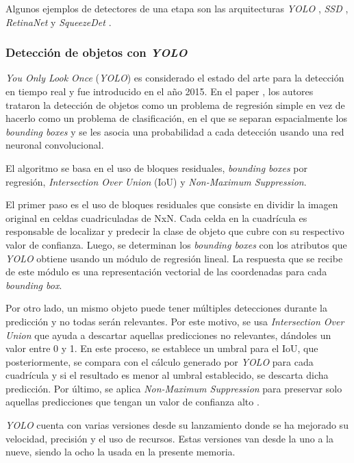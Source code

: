 Algunos ejemplos de detectores de una etapa son las arquitecturas \textit{YOLO} \cite{ARTICLE:13}, \textit{SSD} \cite{ARTICLE:14}, \textit{RetinaNet} \cite{ARTICLE:15} y \textit{SqueezeDet} \cite{ARTICLE:16}. 

\subsubsection{Detección de objetos con \textit{YOLO}}

\textit{You Only Look Once} (\textit{YOLO}) es considerado el estado del arte para la detección en tiempo real y fue introducido en el año 2015. En el paper \cite{ARTICLE:13}, los autores trataron la detección de objetos como un problema de regresión simple en vez de hacerlo como un problema de clasificación, en el que se separan espacialmente los \textit{bounding boxes} y se les asocia una probabilidad a cada detección usando una red neuronal convolucional.

El algoritmo se basa en el uso de bloques residuales, \textit{bounding boxes} por regresión, \textit{Intersection Over Union} (IoU) y \textit{Non-Maximum Suppression}.

El primer paso es el uso de bloques residuales que consiste en dividir la imagen original en celdas cuadriculadas de NxN. Cada celda en la cuadrícula es responsable de localizar y predecir la clase de objeto que cubre con su respectivo valor de confianza. Luego, se determinan los \textit{bounding boxes} con los atributos que \textit{YOLO} obtiene usando un módulo de regresión lineal. La respuesta que se recibe de este módulo es una representación vectorial de las coordenadas para cada \textit{bounding box}.

Por otro lado, un mismo objeto puede tener múltiples detecciones durante la predicción y no todas serán relevantes. Por este motivo, se usa \textit{Intersection Over Union} que ayuda a descartar aquellas predicciones no relevantes, dándoles un valor entre 0 y 1. En este proceso, se establece un umbral para el IoU, que posteriormente, se compara con el cálculo generado por \textit{YOLO} para cada cuadrícula y si el resultado es menor al umbral establecido, se descarta dicha predicción. Por último, se aplica \textit{Non-Maximum Suppression} para preservar solo aquellas predicciones que tengan un valor de confianza alto \cite{WEBSITE:7}.

\textit{YOLO} cuenta con varias versiones desde su lanzamiento donde se ha mejorado su velocidad, precisión y el uso de recursos. Estas versiones van desde la uno a la nueve, siendo la ocho la usada en la presente memoria.

